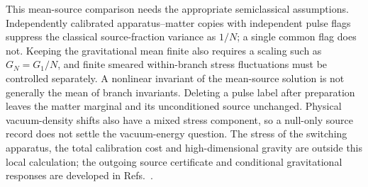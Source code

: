 \documentclass[11pt,a4paper]{article}
\begin{document}
This mean-source comparison needs the appropriate semiclassical assumptions. Independently calibrated apparatus--matter copies with independent pulse flags suppress the classical source-fraction variance as $1/N$; a single common flag does not. Keeping the gravitational mean finite also requires a scaling such as $G_N=G_1/N$, and finite smeared within-branch stress fluctuations must be controlled separately. A nonlinear invariant of the mean-source solution is not generally the mean of branch invariants. Deleting a pulse label after preparation leaves the matter marginal and its unconditioned source unchanged. Physical vacuum-density shifts also have a mixed stress component, so a null-only source record does not settle the vacuum-energy question. The stress of the switching apparatus, the total calibration cost and high-dimensional gravity are outside this local calculation; the outgoing source certificate and conditional gravitational responses
are developed in Refs.~\cite{QRAIFB,HAFFD}.
\end{document}
